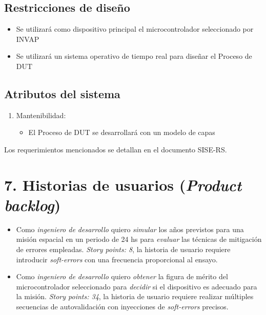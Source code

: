 \documentclass[
11pt, %
]{charter}
\begin{document}
\subsection{Restricciones de diseño}
\label{sub:restriccionesDiseño}

\begin{itemize}
	\item Se utilizará como dispositivo principal el microcontrolador seleccionado por INVAP
	\item Se utilizará un sistema operativo de tiempo real para diseñar el Proceso de DUT
\end{itemize}

\subsection{Atributos del sistema}
\label{sub:atributos}

\begin{enumerate}
	\item Mantenibilidad:
	\begin{itemize}
		\item El Proceso de DUT se desarrollará con un modelo de capas
	\end{itemize}
\end{enumerate}

Los requerimientos mencionados se detallan en el documento SISE-RS.

\section{7. Historias de usuarios (\textit{Product backlog})}
\label{sec:backlog}

\begin{itemize}
	\item Como \emph{ingeniero de desarrollo} quiero \emph{simular} los años previstos para una misión espacial en un periodo de 24 hs para \emph{evaluar} las técnicas de mitigación de errores empleadas. \emph{Story points: 8}, la historia de usuario requiere introducir \emph{soft-errors} con una frecuencia proporcional al ensayo.
	\item Como \emph{ingeniero de desarrollo} quiero \emph{obtener} la figura de mérito del microcontrolador seleccionado para \emph{decidir} si el dispositivo es adecuado para la misión. \emph{Story points: 34}, la historia de usuario requiere realizar múltiples secuencias de autovalidación con inyecciones de \emph{soft-errors} precisos.
\end{itemize}
\end{document}

